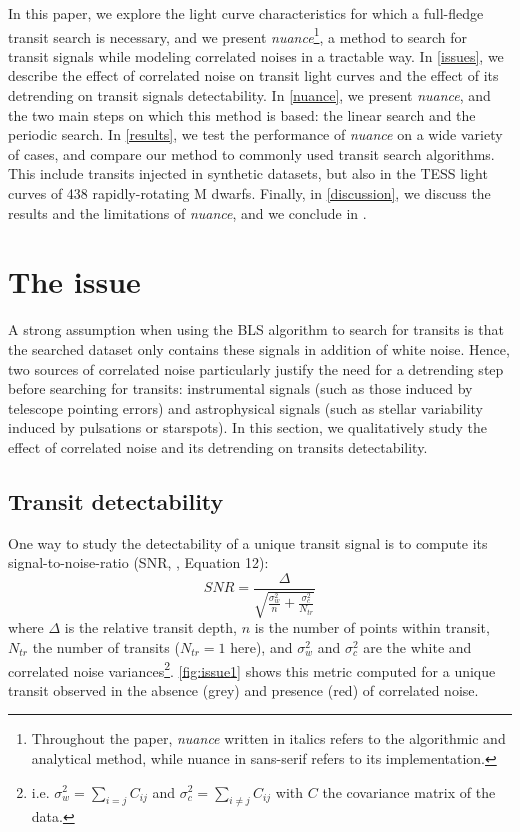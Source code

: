 \documentclass[modern]{aastex631}
\newcommand{\nuancemethod}{\textit{nuance}}
\newcommand{\nuance}{\nuancemethod{}}
\newcommand{\nuancecode}{\textsf{nuance}}
\begin{document}
In this paper, we explore the light curve characteristics for which a full-fledge transit search is necessary, and we present \nuancemethod{}\footnote{Throughout the paper, \nuancemethod{} written in italics refers to the algorithmic and analytical method, while \nuancecode{} in sans-serif refers to its implementation.}, a method to search for transit signals while modeling correlated noises in a tractable way. In \autoref{issues}, we describe the effect of correlated noise on transit light curves and the effect of its detrending on transit signals detectability. In \autoref{nuance}, we present \nuance{}, and the two main steps on which this method is based: the linear search and the periodic search. In \autoref{results}, we test the performance of \nuance{} on a wide variety of cases, and compare our method to commonly used transit search algorithms. This include transits injected in synthetic datasets, but also in the TESS light curves of 438 rapidly-rotating M dwarfs. Finally, in \autoref{discussion}, we discuss the results and the limitations of \nuance{}, and we conclude in .

\newpage
\section{The issue}\label{issues}

A strong assumption when using the BLS algorithm to search for transits is that the searched dataset only contains these signals in addition of white noise. Hence, two sources of correlated noise particularly justify the need for a detrending step before searching for transits: instrumental signals (such as those induced by telescope pointing errors) and astrophysical signals (such as stellar variability induced by pulsations or starspots). In this section, we qualitatively study the effect of correlated noise and its detrending on transits detectability.

\subsection{Transit detectability}

One way to study the detectability of a unique transit signal is to compute its signal-to-noise-ratio (SNR, \citealt{Pont2006}, Equation 12):
\begin{equation}\label{eq:snr}
  SNR= \frac{\Delta}{\sqrt{\frac{\sigma_w^2}{n} + \frac{\sigma_c^2}{N_{tr}}}}
\end{equation}
where $\Delta$ is the relative transit depth, $n$ is the number of points within transit, $N_{tr}$ the number of transits ($N_{tr}=1$ here), and $\sigma_w^2$ and $\sigma_c^2$ are the white and correlated noise variances\footnote{i.e. $\sigma_w^2 = \sum_{i=j} C_{{ij}}$ and $\sigma_c^2 = \sum_{i\neq j} C_{{ij}}$ with $C$ the covariance matrix of the data.}. \autoref{fig:issue1} shows this metric computed for a unique transit observed in the absence (grey) and presence (red) of correlated noise.
\end{document}
